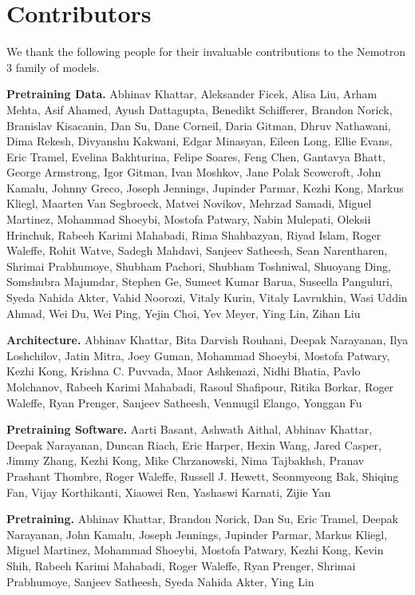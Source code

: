 \section*{Contributors}

We thank the following people for their invaluable contributions to the Nemotron 3 family of models.

\textbf{Pretraining Data.} Abhinav Khattar, Aleksander Ficek, Alisa Liu, Arham Mehta, Asif Ahamed, Ayush Dattagupta, Benedikt Schifferer, Brandon Norick, Branislav Kisacanin, Dan Su, Dane Corneil, Daria Gitman, Dhruv Nathawani, Dima Rekesh, Divyanshu Kakwani, Edgar Minasyan, Eileen Long, Ellie Evans, Eric Tramel, Evelina Bakhturina, Felipe Soares, Feng Chen, Gantavya Bhatt, George Armstrong, Igor Gitman, Ivan Moshkov, Jane Polak Scowcroft, John Kamalu, Johnny Greco, Joseph Jennings, Jupinder Parmar, Kezhi Kong, Markus Kliegl, Maarten Van Segbroeck, Matvei Novikov, Mehrzad Samadi, Miguel Martinez, Mohammad Shoeybi, Mostofa Patwary, Nabin Mulepati, Oleksii Hrinchuk, Rabeeh Karimi Mahabadi, Rima Shahbazyan, Riyad Islam, Roger Waleffe, Rohit Watve, Sadegh Mahdavi, Sanjeev Satheesh, Sean Narentharen, Shrimai Prabhumoye, Shubham Pachori, Shubham Toshniwal, Shuoyang Ding, Somshubra Majumdar, Stephen Ge, Sumeet Kumar Barua, Suseella Panguluri, Syeda Nahida Akter, Vahid Noorozi, Vitaly Kurin, Vitaly Lavrukhin, Wasi Uddin Ahmad, Wei Du, Wei Ping, Yejin Choi, Yev Meyer, Ying Lin, Zihan Liu

\textbf{Architecture.} Abhinav Khattar, Bita Darvish Rouhani, Deepak Narayanan, Ilya Loshchilov, Jatin Mitra, Joey Guman, Mohammad Shoeybi, Mostofa Patwary, Kezhi Kong, Krishna C. Puvvada, Maor Ashkenazi, Nidhi Bhatia, Pavlo Molchanov, Rabeeh Karimi Mahabadi, Rasoul Shafipour, Ritika Borkar, Roger Waleffe, Ryan Prenger, Sanjeev Satheesh, Venmugil Elango, Yonggan Fu

\textbf{Pretraining Software.} Aarti Basant, Ashwath Aithal, Abhinav Khattar, Deepak Narayanan, Duncan Riach, Eric Harper, Hexin Wang, Jared Casper, Jimmy Zhang, Kezhi Kong, Mike Chrzanowski, Nima Tajbakhsh, Pranav Prashant Thombre, Roger Waleffe, Russell J. Hewett, Seonmyeong Bak, Shiqing Fan, Vijay Korthikanti, Xiaowei Ren, Yashaswi Karnati, Zijie Yan

\textbf{Pretraining.} Abhinav Khattar, Brandon Norick, Dan Su, Eric Tramel, Deepak Narayanan, John Kamalu, Joseph Jennings, Jupinder Parmar, Markus Kliegl, Miguel Martinez, Mohammad Shoeybi, Mostofa Patwary, Kezhi Kong, Kevin Shih, Rabeeh Karimi Mahabadi, Roger Waleffe, Ryan Prenger, Shrimai Prabhumoye, Sanjeev Satheesh, Syeda Nahida Akter, Ying Lin 

